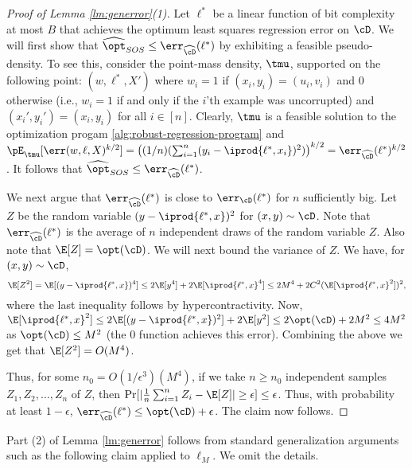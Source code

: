 \begin{proof}[Proof of Lemma \ref{lm:generror}(1)]
Let $\ell^{*}$ be a linear function of bit complexity at most $B$ that achieves the optimum least squares regression error on $\cD$. We will first show that $\widehat{\opt}_{SOS} \leq \err_{\widehat{\cD}}(\ell^*)$ by exhibiting a feasible pseudo-density. To see this, consider the point-mass density, $\tmu$, supported on the following point: $(w,\ell^*,X')$ where $w_i = 1$ if $(x_i,y_i) = (u_i, v_i)$ and $0$ otherwise (i.e., $w_i = 1$ if and only if the $i$'th example was uncorrupted) and $(x_i', y_i') = (x_i,y_i)$ for all $i \in [n]$. Clearly, $\tmu$ is a feasible solution to the optimization progam \ref{alg:robust-regression-program} and $\pE_{\tmu}[\err(w,\ell,X)^{k/2}] = \left((1/n) (\sum_{i=1}^n (y_i - \iprod{\ell^*,x_i})^2)\right)^{k/2} = \err_{\widehat{\cD}}(\ell^*)^{k/2}$. It follows that $\widehat{\opt}_{SOS} \leq  \err_{\widehat{\cD}}(\ell^*)$. 

We next argue that $\err_{\widehat{\cD}}(\ell^*)$ is close to $\err_{\cD}(\ell^*)$ for $n$ sufficiently big. Let $Z$ be the random variable $(y - \iprod{\ell^*,x})^2$ for $(x,y) \sim \cD$. Note that $\err_{\widehat{\cD}}(\ell^*)$ is the average of $n$ independent draws of the random variable $Z$. Also note that $\E[Z] = \opt(\cD)$. We will next bound the variance of $Z$. We have, for $(x,y) \sim \cD$,
\begin{equation*}
\E[Z^2] = \E[(y - \iprod{\ell^*,x})^4] \leq 2 \E[y^4] + 2 \E[\iprod{\ell^*,x}^4] \leq 2 M^4 + 2 C^2 (\E[\iprod{\ell^*,x}^2])^2, 
\end{equation*}
where the last inequality follows by hypercontractivity.
Now, $\E[\iprod{\ell^*,x}^2] \leq 2 \E[(y - \iprod{\ell^*,x})^2] + 2 \E[y^2] \leq 2 \opt(\cD) + 2 M^2 \leq 4 M^2$ as $\opt(\cD) \leq M^2$ (the $0$ function achieves this error). Combining the above we get that $\E[Z^2] = O(M^4)$. 

Thus, for some $n_0 = O(1/ \epsilon^3) (M^4)$, if we take $n \geq n_0$ independent samples $Z_1, Z_2, \ldots,Z_n$ of $Z$, then $\Pr[ |\frac{1}{n} \sum_{i = 1}^n Z_i - \E[Z]| \geq \epsilon] \leq \epsilon$. Thus, with probability at least $1-\epsilon$, $\err_{\widehat{\cD}}(\ell^*) \leq \opt(\cD) + \epsilon$. The claim now follows.
\end{proof}

Part (2) of Lemma \ref{lm:generror} follows from standard generalization arguments such as the following claim applied to $\ell_M$. We omit the details. 

